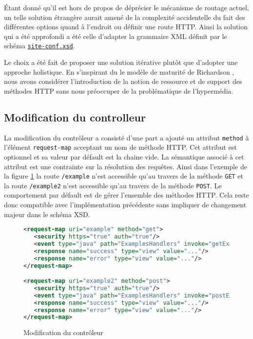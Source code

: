 \documentclass[a4paper, 11pt]{report}
\begin{document}
Étant donné qu'il est hors de propos de déprécier le mécanisme de
routage actuel, un telle solution étrangère aurait amené de la
complexité accidentelle du fait des différentes options quand à
l'endroit ou définir une route HTTP. Ainsi la solution qui a été
approfondi a été celle d'adapter la grammaire XML définit par le
schéma
\href{http://ofbiz.apache.org/dtds/site-conf.xsd}{\nolinkurl{site-conf.xsd}}.

Le choix a été fait de proposer une solution itérative plutôt que
d'adopter une approche holistique. En s'inspirant du le modèle de
maturité de Richardson \cite{fowler2010richardson}, nous avons
considérer l'introduction de la notion de ressource et de support des
méthodes HTTP sans nous préoccuper de la problématique de
l'hypermédia.

\subsection{Modification du controlleur}

La modification du contrôleur a consisté d'une part a ajouté un
attribut \verb=method= à l'élément \verb=request-map= acceptant un nom
de méthode HTTP. Cet attribut est optionnel et sa valeur par défault
est la chaine vide. La sémantique associé à cet attribut est une
contrainte sur la résolution des requêtes. Ainsi dans l'exemple de la
figure \ref{fig:controlmodif} la route \verb=/example= n'est
accessible qu'au travers de la méthode \verb=GET= et la route
\verb=/example2= n'est accessible qu'au travers de la méthode
\verb=POST=. Le comportement par défault est de gérer l'ensemble des
méthodes HTTP. Cela reste donc compatible avec l'implémentation
précédente sans impliquer de changement majeur dans le schéma XSD.

\begin{figure}
  \begin{lstlisting}[language=xml]
<request-map uri="example" method="get">
   <security https="true" auth="true"/>
   <event type="java" path="ExamplesHandlers" invoke="getExamples"/>
   <response name="success" type="view" value="..."/>
   <response name="error" type="view" value="..."/>
</request-map>

<request-map uri="example2" method="post">
   <security https="true" auth="true"/>
   <event type="java" path="ExamplesHandlers" invoke="postExamples"/>
   <response name="success" type="view" value="..."/>
   <response name="error" type="view" value="..."/>
</request-map>
  \end{lstlisting}
  \caption{Modification du contrôleur}
  \label{fig:controlmodif}
\end{figure}
\end{document}
